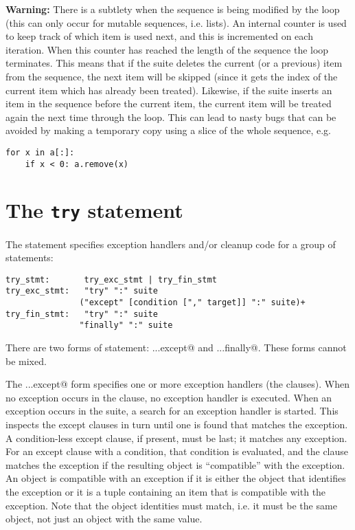 {\bf Warning:} There is a subtlety when the sequence is being modified
by the loop (this can only occur for mutable sequences, i.e. lists).
An internal counter is used to keep track of which item is used next,
and this is incremented on each iteration.  When this counter has
reached the length of the sequence the loop terminates.  This means that
if the suite deletes the current (or a previous) item from the
sequence, the next item will be skipped (since it gets the index of
the current item which has already been treated).  Likewise, if the
suite inserts an item in the sequence before the current item, the
current item will be treated again the next time through the loop.
This can lead to nasty bugs that can be avoided by making a temporary
copy using a slice of the whole sequence, e.g.

\begin{verbatim}
for x in a[:]:
    if x < 0: a.remove(x)
\end{verbatim}

\section{The {\tt try} statement} \label{try}

The \verb@try@ statement specifies exception handlers and/or cleanup
code for a group of statements:

\begin{verbatim}
try_stmt:       try_exc_stmt | try_fin_stmt
try_exc_stmt:   "try" ":" suite
               ("except" [condition ["," target]] ":" suite)+
try_fin_stmt:   "try" ":" suite
               "finally" ":" suite
\end{verbatim}

There are two forms of \verb@try@ statement: \verb@try...except@ and
\verb@try...finally@.  These forms cannot be mixed.

The \verb@try...except@ form specifies one or more exception handlers
(the \verb@except@ clauses).  When no exception occurs in the
\verb@try@ clause, no exception handler is executed.  When an
exception occurs in the \verb@try@ suite, a search for an exception
handler is started.  This inspects the except clauses in turn until
one is found that matches the exception.  A condition-less except
clause, if present, must be last; it matches any exception.  For an
except clause with a condition, that condition is evaluated, and the
clause matches the exception if the resulting object is ``compatible''
with the exception.  An object is compatible with an exception if it
is either the object that identifies the exception or it is a tuple
containing an item that is compatible with the exception.  Note that
the object identities must match, i.e. it must be the same object, not
just an object with the same value.

